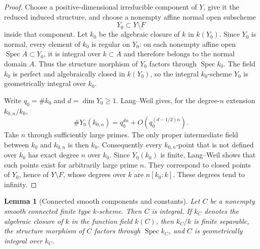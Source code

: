 \documentclass{lms}
\newtheorem{lemma}[theorem]{Lemma}
\DeclareMathOperator{\Spec}{Spec}
\begin{document}
\begin{proof}
Choose a positive-dimensional irreducible component of $Y$, give it the reduced induced structure, and choose a nonempty affine normal open subscheme
\[
        Y_0\subset Y\setminus F
\]
inside that component.  Let $k_0$ be the algebraic closure of $k$ in $k(Y_0)$.  Since $Y_0$ is normal, every element of $k_0$ is regular on $Y_0$: on each nonempty affine open $\Spec A\subset Y_0$, it is integral over $k\subset A$ and therefore belongs to the normal domain $A$.  Thus the structure morphism of $Y_0$ factors through $\Spec k_0$.  The field $k_0$ is perfect and algebraically closed in $k(Y_0)$, so the integral $k_0$-scheme $Y_0$ is geometrically integral over $k_0$.

Write $q_0=\#k_0$ and $d=\dim Y_0\ge1$.  Lang--Weil gives, for the degree-$n$ extension $k_{0,n}/k_0$,
\[
        \#Y_0(k_{0,n})=q_0^{dn}+O(q_0^{(d-1/2)n}).
\]
Take $n$ through sufficiently large primes.  The only proper intermediate field between $k_0$ and $k_{0,n}$ is then $k_0$.  Consequently every $k_{0,n}$-point that is not defined over $k_0$ has exact degree $n$ over $k_0$.  Since $Y_0(k_0)$ is finite, Lang--Weil shows that such points exist for arbitrarily large prime $n$.  They correspond to closed points of $Y_0$, hence of $Y\setminus F$, whose degrees over $k$ are $n[k_0:k]$.  These degrees tend to infinity.
\end{proof}


\begin{lemma}[Connected smooth components and constants]\label{lem:component-constants}
Let $C$ be a nonempty smooth connected finite type $k$-scheme.  Then $C$ is integral.  If $k_C$ denotes the algebraic closure of $k$ in the function field $k(C)$, then $k_C/k$ is finite separable, the structure morphism of $C$ factors through $\Spec k_C$, and $C$ is geometrically integral over $k_C$.
\end{lemma}
\end{document}
